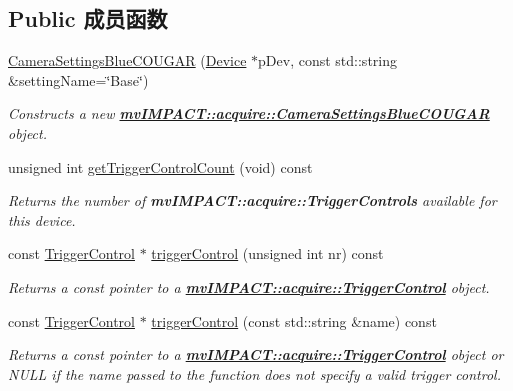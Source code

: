 \subsection*{Public 成员函数}
\begin{DoxyCompactItemize}
\item 
\hyperlink{classmv_i_m_p_a_c_t_1_1acquire_1_1_camera_settings_blue_c_o_u_g_a_r_a2955cf571183873bf9da11046cc6d6e1}{Camera\+Settings\+Blue\+C\+O\+U\+G\+A\+R} (\hyperlink{classmv_i_m_p_a_c_t_1_1acquire_1_1_device}{Device} $\ast$p\+Dev, const std\+::string \&setting\+Name=\char`\"{}Base\char`\"{})
\begin{DoxyCompactList}\small\item\em Constructs a new {\bfseries \hyperlink{classmv_i_m_p_a_c_t_1_1acquire_1_1_camera_settings_blue_c_o_u_g_a_r}{mv\+I\+M\+P\+A\+C\+T\+::acquire\+::\+Camera\+Settings\+Blue\+C\+O\+U\+G\+A\+R}} object. \end{DoxyCompactList}\item 
unsigned int \hyperlink{classmv_i_m_p_a_c_t_1_1acquire_1_1_camera_settings_blue_c_o_u_g_a_r_aff8899f2fbf1f123497b0e9521acb87f}{get\+Trigger\+Control\+Count} (void) const 
\begin{DoxyCompactList}\small\item\em Returns the number of {\bfseries mv\+I\+M\+P\+A\+C\+T\+::acquire\+::\+Trigger\+Controls} available for this device. \end{DoxyCompactList}\item 
const \hyperlink{classmv_i_m_p_a_c_t_1_1acquire_1_1_trigger_control}{Trigger\+Control} $\ast$ \hyperlink{classmv_i_m_p_a_c_t_1_1acquire_1_1_camera_settings_blue_c_o_u_g_a_r_a2eb408af4cba5226fa5d08e2fe7eeea7}{trigger\+Control} (unsigned int nr) const 
\begin{DoxyCompactList}\small\item\em Returns a const pointer to a {\bfseries \hyperlink{classmv_i_m_p_a_c_t_1_1acquire_1_1_trigger_control}{mv\+I\+M\+P\+A\+C\+T\+::acquire\+::\+Trigger\+Control}} object. \end{DoxyCompactList}\item 
const \hyperlink{classmv_i_m_p_a_c_t_1_1acquire_1_1_trigger_control}{Trigger\+Control} $\ast$ \hyperlink{classmv_i_m_p_a_c_t_1_1acquire_1_1_camera_settings_blue_c_o_u_g_a_r_a048c0ffe1e1508fe7b185052dd9d1d7e}{trigger\+Control} (const std\+::string \&name) const 
\begin{DoxyCompactList}\small\item\em Returns a const pointer to a {\bfseries \hyperlink{classmv_i_m_p_a_c_t_1_1acquire_1_1_trigger_control}{mv\+I\+M\+P\+A\+C\+T\+::acquire\+::\+Trigger\+Control}} object or N\+U\+L\+L if the name passed to the function does not specify a valid trigger control. \end{DoxyCompactList}\item 

\end{DoxyCompactItemize}
